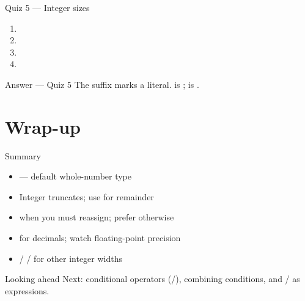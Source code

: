 \documentclass[aspectratio=169,11pt]{beamer}
\begin{document}
    \begin{frame}{Quiz 5 --- Integer sizes}
        \begin{enumerate}
            \item {}
            \item {}
            \item {}
            \item {}
        \end{enumerate}
        \quizpause
    \end{frame}

    \begin{frame}{Answer --- Quiz 5}
        \vspace{0.4em}
        The  suffix marks a  literal.
         is ;  is .
    \end{frame}

    \section{Wrap-up}

    \begin{frame}{Summary}
        \begin{itemize}
            \item {} --- default whole-number type
            \item Integer \kotlincode{/} truncates; use \kotlincode{\%} for remainder
            \item {} when you must reassign; prefer  otherwise
            \item {} for decimals; watch floating-point precision
            \item {} /  /  for other integer widths
        \end{itemize}
    \end{frame}

    \begin{frame}{Looking ahead}
        Next: conditional operators (/), combining conditions,
        and / as expressions.
    \end{frame}
\end{document}
